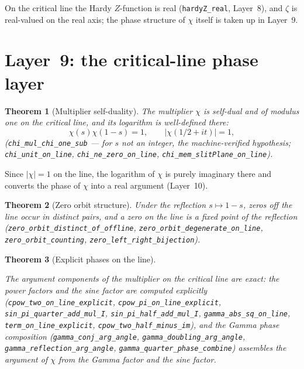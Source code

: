 \documentclass{article}
\newtheorem{theorem}{Theorem}[section]
\newcommand{\zt}{\zeta}
\newcommand{\Xchi}{\chi}
\begin{document}
On the critical line the Hardy $Z$-function is real
(\texttt{hardyZ\_real}, Layer~8), and $\zt$ is real-valued on the real
axis; the phase structure of $\Xchi$ itself is taken up in Layer~9.

\section{Layer~9: the critical-line phase layer}
\label{sec:L9}

\begin{theorem}[Multiplier self-duality]
\label{thm:chidual}
The multiplier $\Xchi$ is self-dual and of modulus one on the critical
line, and its logarithm is well-defined there:
\[
\Xchi(s)\Xchi(1-s)=1,\qquad |\Xchi(1/2+it)|=1,
\]
(\texttt{chi\_mul\_chi\_one\_sub} --- for $s$ not an integer, the
machine-verified hypothesis; \texttt{chi\_unit\_on\_line},
\texttt{chi\_ne\_zero\_on\_line}, \texttt{chi\_mem\_slitPlane\_on\_line}).
\end{theorem}

Since $|\Xchi|=1$ on the line, the logarithm of $\Xchi$ is purely imaginary
there and converts the phase of $\Xchi$ into a real argument (Layer~10).

\begin{theorem}[Zero orbit structure]
\label{thm:orbit}
Under the reflection $s\mapsto 1-s$, zeros off the line occur in distinct
pairs, and a zero on the line is a fixed point of the reflection
(\texttt{zero\_orbit\_distinct\_of\_offline},
\texttt{zero\_orbit\_degenerate\_on\_line}, \texttt{zero\_orbit\_counting},
\texttt{zero\_left\_right\_bijection}).
\end{theorem}

\begin{theorem}[Explicit phases on the line]
\label{thm:explicit}
\begin{sloppypar}The argument components of the multiplier on the critical
line are exact: the power factors and the sine factor are computed
explicitly
(\texttt{cpow\_two\_on\_line\_explicit}, \texttt{cpow\_pi\_on\_line\_explicit},
\texttt{sin\_pi\_quarter\_add\_mul\_I}, \texttt{sin\_pi\_half\_add\_mul\_I},
\texttt{gamma\_abs\_sq\_on\_line}, \texttt{term\_on\_line\_explicit},
\texttt{cpow\_two\_half\_minus\_im}), and the Gamma phase composition
(\texttt{gamma\_conj\_arg\_angle}, \texttt{gamma\_doubling\_arg\_angle},
\texttt{gamma\_reflection\_arg\_angle}, \texttt{gamma\_quarter\_phase\_combine})
assembles the argument of $\Xchi$ from the Gamma factor and the sine
factor.\end{sloppypar}
\end{theorem}
\end{document}
